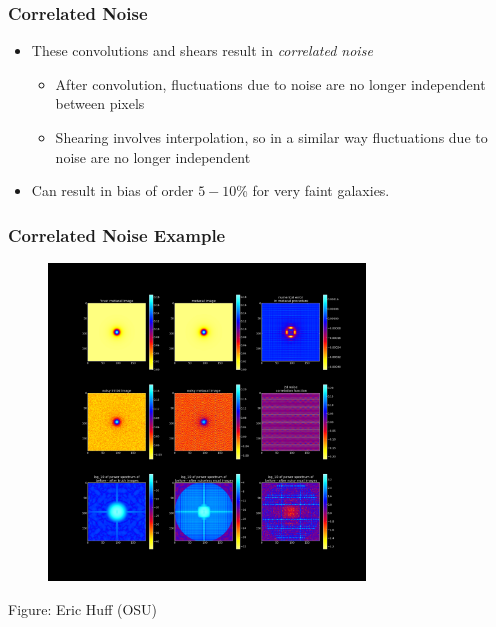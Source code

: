 \documentclass{beamer}
\begin{document}
\frame
{
    \frametitle{Correlated Noise}

 
    \begin{itemize}

        \item These convolutions and shears result in {\em {\color{gold} correlated noise}}
            
        \begin{itemize}
            \item After convolution, fluctuations due to noise are no longer
                independent between pixels

            \item Shearing involves interpolation, so in a similar way fluctuations
                due to noise are no longer independent
        \end{itemize}

        \item Can result in bias of order $5-10$\% for very faint galaxies.


    \end{itemize}

}

\frame
{
    \frametitle{Correlated Noise Example}

    \begin{figure}
        \includegraphics[width=0.75\textwidth]{metacal_noise_images_neg.png}
    \end{figure}
    Figure: Eric Huff (OSU)
}
\end{document}
